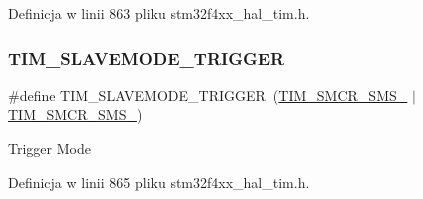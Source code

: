 Definicja w linii 863 pliku stm32f4xx\+\_\+hal\+\_\+tim.\+h.

\mbox{\label{group___t_i_m___slave___mode_ga12f8f7b4a16b438f54cf811f0bb0a8a4}} 
\subsubsection{\texorpdfstring{T\+I\+M\+\_\+\+S\+L\+A\+V\+E\+M\+O\+D\+E\+\_\+\+T\+R\+I\+G\+G\+ER}{TIM\_SLAVEMODE\_TRIGGER}}
{\footnotesize\ttfamily \#define T\+I\+M\+\_\+\+S\+L\+A\+V\+E\+M\+O\+D\+E\+\_\+\+T\+R\+I\+G\+G\+ER~(\hyperlink{group___peripheral___registers___bits___definition_ga63847fc3c71f582403e6301b1229c3ed}{T\+I\+M\+\_\+\+S\+M\+C\+R\+\_\+\+S\+M\+S\+\_} $\vert$ \hyperlink{group___peripheral___registers___bits___definition_gaa980a3121ab6cda5a4a42b959da8421e}{T\+I\+M\+\_\+\+S\+M\+C\+R\+\_\+\+S\+M\+S\+\_})}

Trigger Mode 

Definicja w linii 865 pliku stm32f4xx\+\_\+hal\+\_\+tim.\+h.

